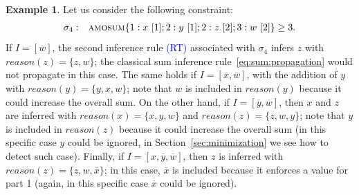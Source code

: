 \documentclass[preprint,authoryear]{elsarticle}
\theoremstyle{definition}
\newtheorem{example}{Example}[section]
\def\amosum{\ensuremath{\textsc{amosum}}\xspace}
\begin{document}



\begin{example}\label{ex:amosum:propagation:more-2}
Let us consider the following constraint:
\begin{align*}
\begin{array}{rl}
    \sigma_{4}: & \amosum\{
        1 : x\ [1]; 2 : y\ [1]; 2 : z\ [2]; 3 : w\ [2]
    \} \geq 3.
\end{array}
\end{align*}
If $I = [\overline{w}]$, the second inference rule \textcolor{blue}{(RT)} associated with $\sigma_4$ infers $z$ with $\mathit{reason}(z) = \{z, w\}$; the classical sum inference rule~\eqref{eq:sum:propagation} would not propagate in this case.
%
The same holds if $I = [\overline{x}, \overline{w}]$, with the addition of $y$ with $\mathit{reason}(y) = \{y, x, w\}$;
note that $w$ is included in $\mathit{reason}(y)$ because it could increase the overall sum.
%
On the other hand, if $I = [\overline{y}, \overline{w}]$, then $x$ and $z$ are inferred with 
$\mathit{reason}(x) = \{x, y, w\}$ and
$\mathit{reason}(z) = \{z, w, y\}$;
note that $y$ is included in $\mathit{reason}(z)$ because it could increase the overall sum (in this specific case $y$ could be ignored, in Section~\ref{sec:minimization} we see how to detect such case).
Finally, if $I = [x, \overline{y}, \overline{w}]$, then $z$ is inferred with $\mathit{reason}(z) = \{z, w, \overline{x}\}$;
in this case, $\overline{x}$ is included because it enforces a value for part 1 (again, in this specific case $\overline{x}$ could be ignored).
\end{example}
\end{document}
